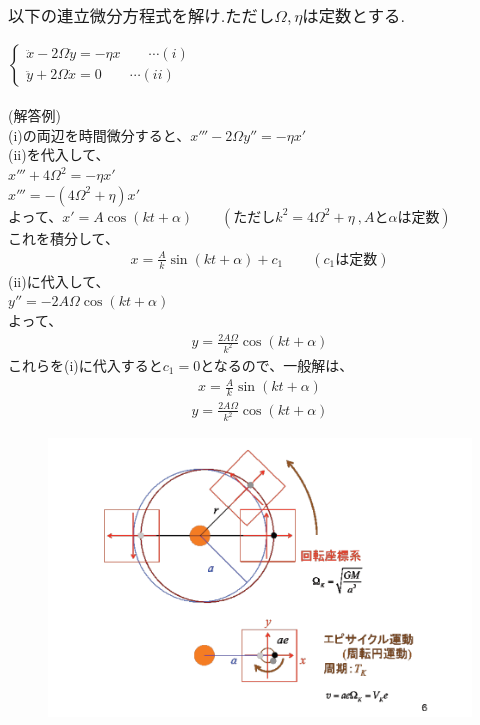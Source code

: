 \documentclass[a4paper,11pt,fleqn]{jarticle}
\begin{document}
\newpage
\subsection{}
\subsubsection{$以下の連立微分方程式を解け.ただし\Omega ,\eta は定数とする.$}
$\left\{ \begin{array}{l}
\ddot{x}-2\Omega \dot{y}=-\eta x \qquad \cdots (i) \\
\ddot{y}+2\Omega \dot{x}=0 \qquad \cdots (ii)
\end{array} \right.$
\\
\\
(解答例)\\
(i)の両辺を時間微分すると、$x'''-2\Omega y''=-\eta x'$\\
(ii)を代入して、\\
$x'''+4{\Omega}^2=-\eta x'$\\
$x'''=-(4{\Omega}^2+\eta)x'$\\
よって、$x'=A\cos(kt+\alpha) \qquad (ただしk^2=4{\Omega}^2+\eta ~,Aと\alpha は定数)$\\
これを積分して、
\begin{eqnarray*}
x=\frac{A}{k}\sin(kt+\alpha)+c_1 \qquad (c_1は定数)
\end{eqnarray*}
(ii)に代入して、\\
$y''=-2A\Omega\cos(kt+\alpha)$\\
よって、
\begin{eqnarray*}
y=\frac{2A\Omega}{k^2}\cos(kt+\alpha)
\end{eqnarray*}
これらを(i)に代入すると$c_1=0$となるので、一般解は、
\begin{eqnarray*}
x=\frac{A}{k}\sin(kt+\alpha)
\end{eqnarray*}
\begin{eqnarray*}
y=\frac{2A\Omega}{k^2}\cos(kt+\alpha)
\end{eqnarray*}
\begin{figure}[htpb]
\begin{center}
\includegraphics[scale=.30]{nakamoto.png}
\end{center}
\end{figure}
\end{document}
